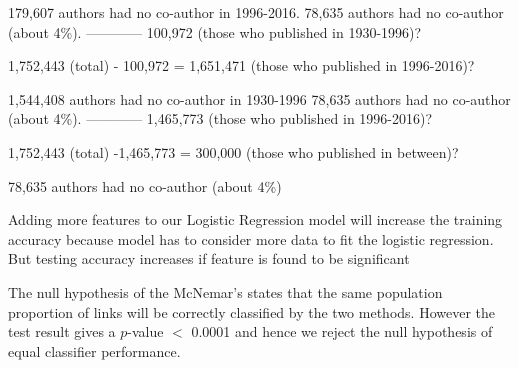     179,607 authors had no co-author in 1996-2016. 
    78,635 authors had no co-author (about 4\%). 
    ------------
    100,972 (those who published in 1930-1996)?
    
    1,752,443 (total) - 100,972 = 1,651,471 (those who published in 1996-2016)?
    
    1,544,408 authors had no co-author in 1930-1996
    78,635 authors had no co-author (about 4\%). 
    ------------
    1,465,773 (those who published in 1996-2016)?

    1,752,443 (total) -1,465,773 = 300,000 (those who published in between)?
    
    
78,635 authors had no co-author (about 4\%)

Adding more features to our Logistic Regression model will increase the training accuracy because model has to consider more data to fit the logistic regression. But testing accuracy increases if feature is found to be significant

The null hypothesis of the McNemar's states that the same population proportion of links will be correctly classified by the two methods. However the test result gives a $p$-value $<$ 0.0001 and hence we reject the null hypothesis of equal classifier performance.

